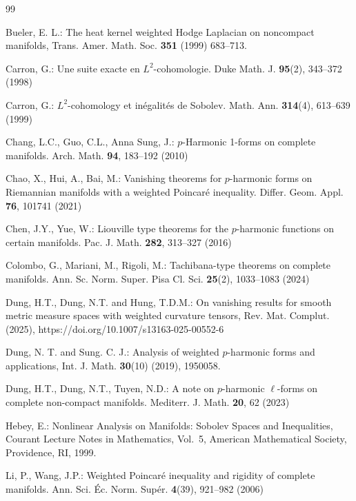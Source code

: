 \documentclass[leqno,12pt]{article} %
\theoremstyle{plain} %
\theoremstyle{definition} %
\numberwithin{equation}{section}
\begin{document}
\begin{thebibliography}{99}
    
Bueler, E. L.: The heat kernel weighted Hodge Laplacian on noncompact manifolds, Trans. Amer. Math. Soc. {\bf 351} (1999) 683--713.

Carron, G.: Une suite exacte en $L^2$-cohomologie. Duke Math. J. \textbf{95}(2), 343–372 (1998)
        
Carron, G.: $L^2$-cohomology et inégalités de Sobolev. Math. Ann. \textbf{314}(4), 613–639 (1999)

Chang, L.C., Guo, C.L., Anna Sung, J.: $p$-Harmonic 1-forms on complete manifolds. Arch. Math. \textbf{94}, 183–192 (2010)

Chao, X., Hui, A., Bai, M.: Vanishing theorems for $p$-harmonic forms on
Riemannian manifolds with a weighted Poincaré inequality. Differ. Geom. Appl. {\bf 76}, 101741 (2021)

Chen, J.Y., Yue, W.: Liouville type theorems for the $p$-harmonic functions on certain manifolds. Pac. J. Math. {\bf 282}, 313–327 (2016)
 
Colombo, G., Mariani, M., Rigoli, M.: Tachibana-type theorems on complete manifolds. Ann. Sc. Norm. Super. Pisa Cl. Sci. \textbf{25}(2), 1033–1083 (2024)

 Dung, H.T., Dung, N.T. and Hung, T.D.M.:  On vanishing results for smooth metric measure spaces with weighted curvature tensors,  Rev. Mat. Complut.  (2025), https://doi.org/10.1007/s13163-025-00552-6

 Dung, N. T.  and Sung. C. J.:  Analysis of weighted $p$-harmonic forms and applications, Int. J. Math.  \textbf{30}(10) (2019), 1950058.

Dung, H.T., Dung, N.T., Tuyen, N.D.: A note on $p$-harmonic $\ell$-forms on complete non-compact manifolds. Mediterr. J. Math. \textbf{20}, 62 (2023)

Hebey, E.: Nonlinear Analysis on Manifolds: Sobolev Spaces and Inequalities, Courant Lecture Notes in Mathematics, Vol.~5,
American Mathematical Society, Providence, RI, 1999.

Li, P., Wang, J.P.: Weighted Poincaré inequality and rigidity of complete manifolds. Ann. Sci. Éc. Norm. Supér. \textbf{4}(39), 921–982 (2006)


\end{thebibliography}
\end{document}
